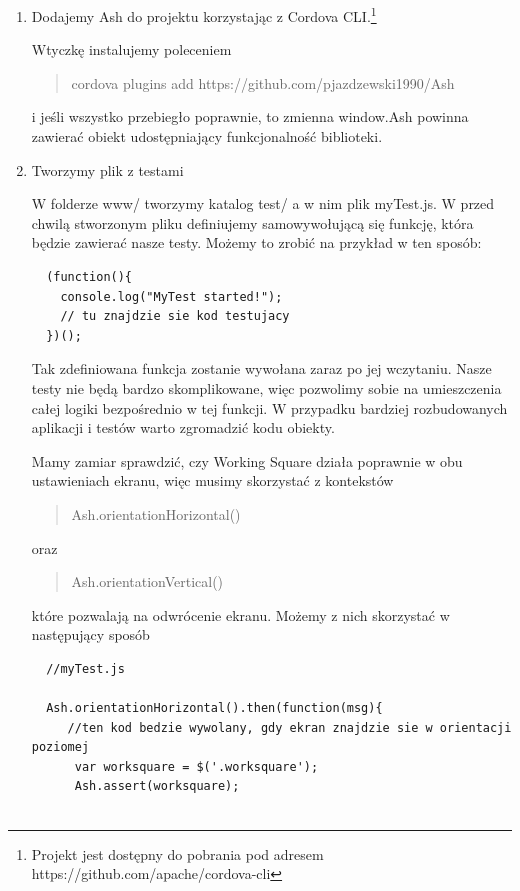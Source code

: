 \documentclass[brudnopis]{xmgr}
\begin{document}
\begin{enumerate}
  \item Dodajemy Ash do projektu korzystając z Cordova CLI.\footnote{Projekt jest dostępny do pobrania pod adresem https://github.com/apache/cordova-cli}

Wtyczkę instalujemy poleceniem 
\begin{quote}
   cordova plugins add https://github.com/pjazdzewski1990/Ash
\end{quote}
i jeśli wszystko przebiegło poprawnie, to zmienna window.Ash powinna zawierać obiekt udostępniający funkcjonalność biblioteki.  

 \item Tworzymy plik z testami

W folderze www/ tworzymy katalog test/ a w nim plik myTest.js. W przed chwilą stworzonym pliku definiujemy samowywołującą się funkcję, która będzie zawierać nasze testy. Możemy to zrobić na przykład w ten sposób:

 \begin{lstlisting}
  (function(){
	console.log("MyTest started!");
	// tu znajdzie sie kod testujacy
  })();
\end{lstlisting}

Tak zdefiniowana funkcja zostanie wywołana zaraz po jej wczytaniu. Nasze testy nie będą bardzo skomplikowane, więc pozwolimy sobie na umieszczenia całej logiki bezpośrednio w tej funkcji. W przypadku bardziej rozbudowanych aplikacji i testów warto zgromadzić kodu obiekty.

Mamy zamiar sprawdzić, czy Working Square działa poprawnie w obu ustawieniach ekranu, więc musimy skorzystać z kontekstów 

\begin{quote}
   Ash.orientationHorizontal()
\end{quote}

oraz 

\begin{quote}
   Ash.orientationVertical()
\end{quote}

które pozwalają na odwrócenie ekranu. Możemy z nich skorzystać w następujący sposób

 \begin{lstlisting}
  //myTest.js

  Ash.orientationHorizontal().then(function(msg){
     //ten kod bedzie wywolany, gdy ekran znajdzie sie w orientacji poziomej
      var worksquare = $('.worksquare');
      Ash.assert(worksquare);
      

\end{lstlisting}
\end{enumerate}
\end{document}

